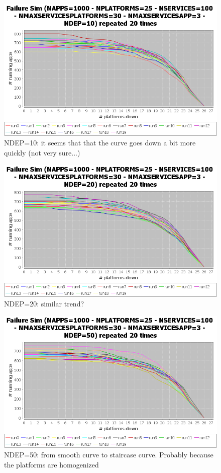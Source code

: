 \documentclass{article}
\begin{document}
\begin{figure}
\includegraphics[width=1.0\textwidth]{dep10}
\caption{NDEP=10:  it seems that that the curve goes down a bit more quickly (not very sure...)}
\end{figure}

\begin{figure}
\includegraphics[width=1.0\textwidth]{dep20}
\caption{NDEP=20:  similar trend?}
\end{figure}

\begin{figure}
\includegraphics[width=1.0\textwidth]{dep50}
\caption{NDEP=50:  from smooth curve to staircase curve. Probably because the platforms are homogenized}
\end{figure}
\end{document}
